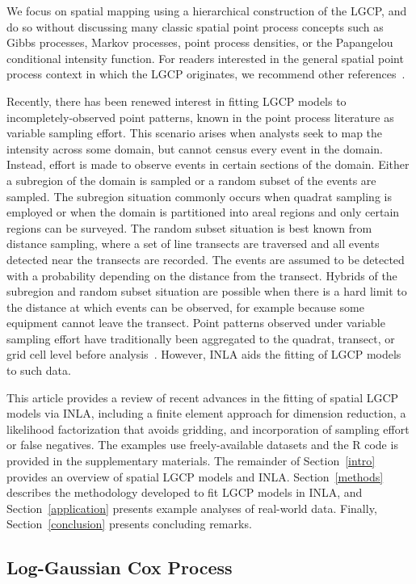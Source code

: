 \documentclass[]{interact}
\begin{document}
We focus on spatial mapping using a hierarchical construction of the LGCP, and
do so without discussing many classic spatial point process concepts such as
Gibbs processes, Markov processes, point process densities, or the Papangelou
conditional intensity function. For readers interested in the general spatial
point process context in which the LGCP originates, we recommend other
references~\cite{moellerwaagepetersen, digglepoint, cressie}.

Recently, there has been renewed interest in fitting LGCP models to
incompletely-observed point patterns, known in the point process literature as
variable sampling effort. This scenario arises when analysts seek to map the
intensity across some domain, but cannot census every event in the domain.
Instead, effort is made to observe events in certain sections of the domain.
Either a subregion of the domain is sampled or a random subset of the events
are sampled. The subregion situation commonly occurs when quadrat sampling is
employed or when the domain is partitioned into areal regions and only certain
regions can be surveyed. The random subset situation is best known from
distance sampling, where a set of line transects are traversed and all events
detected near the transects are recorded. The events are assumed to be detected
with a probability depending on the distance from the transect. Hybrids of the
subregion and random subset situation are possible when there is a hard limit
to the distance at which events can be observed, for example because some
equipment cannot leave the transect. Point patterns observed under variable
sampling effort have traditionally been aggregated to the quadrat, transect,
or grid cell level before analysis~\cite{digglepoint}. However, INLA aids the
fitting of LGCP models to such data.

This article provides a review of recent advances in the fitting of spatial
LGCP models via INLA, including a finite element approach for dimension
reduction, a likelihood factorization that avoids gridding, and incorporation
of sampling effort or false negatives. The examples use freely-available
datasets and the R code is provided in the supplementary materials. The remainder of
Section~\ref{intro} provides an overview of spatial LGCP
models and INLA. Section~\ref{methods} describes the methodology developed to
fit LGCP models in INLA, and Section~\ref{application} presents example
analyses of real-world data. Finally, Section~\ref{conclusion} presents
concluding remarks.

\subsection{Log-Gaussian Cox Process}
\label{lgcp}
\end{document}
